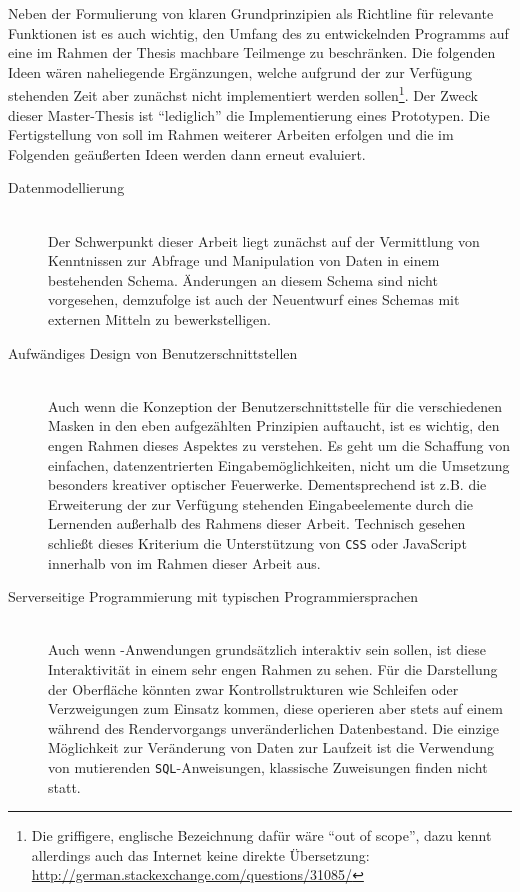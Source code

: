 Neben der Formulierung von klaren Grundprinzipien als Richtline für relevante Funktionen ist es auch wichtig, den Umfang des zu entwickelnden Programms auf eine im Rahmen der Thesis machbare Teilmenge zu beschränken. Die folgenden Ideen wären naheliegende Ergänzungen, welche aufgrund der zur Verfügung stehenden Zeit aber zunächst nicht implementiert werden sollen\footnote{Die griffigere, englische Bezeichnung dafür wäre "`out of scope"', dazu kennt allerdings auch das Internet keine direkte Übersetzung: \url{http://german.stackexchange.com/questions/31085/}}. Der Zweck dieser Master-Thesis ist "`lediglich"' die Implementierung eines Prototypen. Die Fertigstellung von \idename{} soll im Rahmen weiterer Arbeiten erfolgen und die im Folgenden geäußerten Ideen werden dann erneut evaluiert.

\begin{description}
\item[Datenmodellierung] \label{scope:no-data-modelling} \hfill \\
  Der Schwerpunkt dieser Arbeit liegt zunächst auf der Vermittlung von Kenntnissen zur Abfrage und Manipulation von Daten in einem bestehenden Schema. Änderungen an diesem Schema sind nicht vorgesehen, demzufolge ist auch der Neuentwurf eines Schemas mit externen Mitteln zu bewerkstelligen.
\item[Aufwändiges Design von Benutzerschnittstellen] \label{scope:no-design} \hfill \\
  Auch wenn die Konzeption der Benutzerschnittstelle für die verschiedenen Masken in den eben aufgezählten Prinzipien auftaucht, ist es wichtig, den engen Rahmen dieses Aspektes zu verstehen. Es geht um die Schaffung von einfachen, datenzentrierten Eingabemöglichkeiten, nicht um die Umsetzung besonders kreativer optischer Feuerwerke. Dementsprechend ist z.B. die Erweiterung der zur Verfügung stehenden Eingabeelemente durch die Lernenden außerhalb des Rahmens dieser Arbeit. Technisch gesehen schließt dieses Kriterium die Unterstützung von \texttt{CSS} oder JavaScript innerhalb von \idename{} im Rahmen dieser Arbeit aus.
\item[Serverseitige Programmierung mit typischen Programmiersprachen] \label{scope:no-programming} \hfill \\
  Auch wenn \idename{}-Anwendungen grundsätzlich interaktiv sein sollen, ist diese Interaktivität in einem sehr engen Rahmen zu sehen. Für die Darstellung der Oberfläche könnten zwar Kontrollstrukturen wie Schleifen oder Verzweigungen zum Einsatz kommen, diese operieren aber stets auf einem während des Rendervorgangs unveränderlichen Datenbestand. Die einzige Möglichkeit zur Veränderung von Daten zur Laufzeit ist die Verwendung von mutierenden \texttt{SQL}-Anweisungen, klassische Zuweisungen finden nicht statt.
\end{description}


